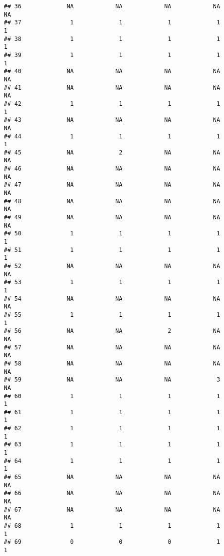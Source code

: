 \documentclass[
]{article}
\begin{document}
\begin{verbatim}
## 36             NA            NA            NA            NA            NA
## 37              1             1             1             1             1
## 38              1             1             1             1             1
## 39              1             1             1             1             1
## 40             NA            NA            NA            NA            NA
## 41             NA            NA            NA            NA            NA
## 42              1             1             1             1             1
## 43             NA            NA            NA            NA            NA
## 44              1             1             1             1             1
## 45             NA             2            NA            NA            NA
## 46             NA            NA            NA            NA            NA
## 47             NA            NA            NA            NA            NA
## 48             NA            NA            NA            NA            NA
## 49             NA            NA            NA            NA            NA
## 50              1             1             1             1             1
## 51              1             1             1             1             1
## 52             NA            NA            NA            NA            NA
## 53              1             1             1             1             1
## 54             NA            NA            NA            NA            NA
## 55              1             1             1             1             1
## 56             NA            NA             2            NA            NA
## 57             NA            NA            NA            NA            NA
## 58             NA            NA            NA            NA            NA
## 59             NA            NA            NA             3            NA
## 60              1             1             1             1             1
## 61              1             1             1             1             1
## 62              1             1             1             1             1
## 63              1             1             1             1             1
## 64              1             1             1             1             1
## 65             NA            NA            NA            NA            NA
## 66             NA            NA            NA            NA            NA
## 67             NA            NA            NA            NA            NA
## 68              1             1             1             1             1
## 69              0             0             0             1             1

\end{verbatim}
\end{document}
